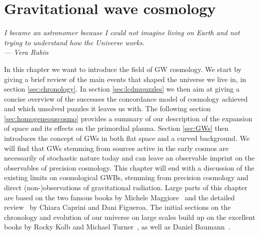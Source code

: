 
\chapter{Gravitational wave cosmology} \label{chp:gwcosmo}

\begin{flushright}
	\slshape
	I became an astronomer because I could not imagine living on Earth and not trying to understand how the Universe works.\\ \medskip
	--- Vera Rubin
\end{flushright}

In this chapter we want to introduce the field of \ac{GW} cosmology. We start by giving a brief review of the main events that shaped the universe we live in, in section \ref{sec:chronology}. In section \ref{sec:lcdmpuzzles} we then aim at giving a concise overview of the successes the concordance model of cosmology achieved and which unsolved puzzles it leaves us with.  The following section \ref{sec:homogeneouscosmo} provides a summary of our description of the expansion of space and its effects on the primordial plasma. Section \ref{sec:GWs} then introduces the concept of \acp{GW} in both flat space and a curved background. We will find that \acp{GW} stemming from sources active in the early cosmos are necessarily of stochastic nature today and can leave an observable imprint on the observables of precision cosmology. This chapter will end with a discussion of the existing limits on cosmological \acp{GWB}, stemming from precision cosmology and direct (non-)observations of gravitational radiation. Large parts of this chapter are based on the two famous books by Michele Maggiore~\cite{Maggiore:2007ulw,Maggiore:2018sht} and the detailed review~\cite{Caprini:2018mtu} by Chiara Caprini and Dani Figueroa. The initial sections on the chronology and evolution of our universe on large scales build up on the excellent books by Rocky Kolb and Michael Turner~\cite{Kolb:1990vq}, as well as Daniel Baumann~\cite{Baumann:2022mni}.

